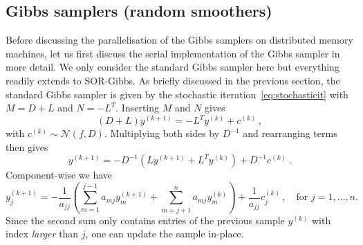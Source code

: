 \documentclass[
fontsize=11pt,
paper=a4,
numbers=noenddot
]{scrartcl}
\begin{document}
\subsection{Gibbs samplers (random smoothers)}
Before discussing the parallelisation of the Gibbs samplers on distributed memory machines, let us first discuss the serial implementation of the Gibbs sampler in more detail. We only consider the standard Gibbs sampler here but everything readily extends to SOR-Gibbs. As briefly discussed in the previous section, the standard Gibbs sampler is given by the stochastic iteration~\eqref{eq:stochasticit} with $M = D + L$ and $N = -L^T$. Inserting $M$ and $N$ gives
\begin{equation*}
    \left(D + L\right) y^{(k+1)} = - L^T y^{(k)} + c^{(k)}\,,
\end{equation*}
with $c^{(k)} \sim \mathcal{N}(f,D)$. Multiplying both sides by $D^{-1}$ and rearranging terms then gives
\begin{equation*}
    y^{(k+1)} = - D^{-1} (L y^{(k+1)} + L^T y^{(k)}) + D^{-1} c^{(k)}\,.
\end{equation*}
Component-wise we have
\begin{equation}
    \label{eq:gibbs_comp}
    y^{(k+1)}_j = - \frac{1}{a_{jj}} \left(
        \sum_{m=1}^{j-1} a_{mj} y^{(k+1)}_m + \sum_{m=j+1}^n a_{mj} y^{(k)}_m
    \right) + \frac{1}{a_{jj}} c^{(k)}_j \,,\quad \text{for $j=1,\dotsc,n$.}
\end{equation}
Since the second sum only contains entries of the previous sample $y^{(k)}$ with index \emph{larger} than $j$, one can update the sample in-place. 
\end{document}
